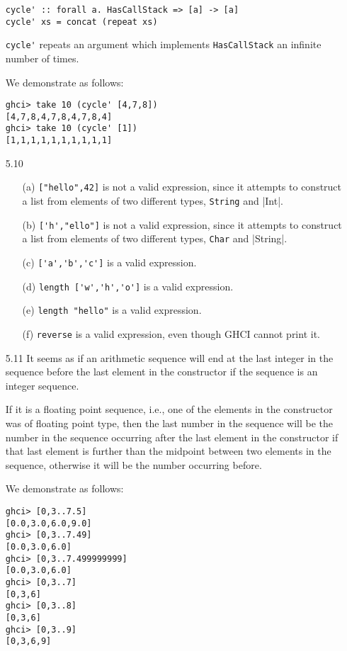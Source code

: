 \documentclass{article}
\begin{document}
\begin{itemize}
\begin{verbatim}
cycle' :: forall a. HasCallStack => [a] -> [a]
cycle' xs = concat (repeat xs)
        \end{verbatim}
        \verb|cycle'| repeats an argument which implements \verb|HasCallStack| an
        infinite number of times.\par
        \qquad We demonstrate as follows:
        \begin{verbatim}
ghci> take 10 (cycle' [4,7,8])
[4,7,8,4,7,8,4,7,8,4]
ghci> take 10 (cycle' [1])
[1,1,1,1,1,1,1,1,1,1]
        \end{verbatim}
        \item[5.10]
        \begin{itemize}
            \item[(a)] \verb|["hello",42]| is not a valid expression, since it
            attempts to construct a list from elements of two different types,
            \verb|String| and |Int|.
            \item[(b)] \verb|['h',"ello"]| is not a valid expression, since it
            attempts to construct a list from elements of two different types,
            \verb|Char| and |String|.
            \item[(c)] \verb|['a','b','c']| is a valid expression.
            \item[(d)] \verb|length ['w','h','o']| is a valid expression.
            \item[(e)] \verb|length "hello"| is a valid expression.
            \item[(f)] \verb|reverse| is a valid expression, even though GHCI cannot
            print it.
        \end{itemize}
        \item[5.11] It seems as if an arithmetic sequence will end at the last 
        integer in the sequence before the last element in the constructor if the 
        sequence is an integer sequence.\par
        \qquad If it is a floating point sequence, i.e., one of the elements in the 
        constructor was of floating point type, then the last number in the sequence 
        will be the number in the sequence occurring after the last element in the 
        constructor if that last element is further than the midpoint between two 
        elements in the sequence, otherwise it will be the number occurring before.\par
        We demonstrate as follows:
        \begin{verbatim}
ghci> [0,3..7.5]
[0.0,3.0,6.0,9.0]
ghci> [0,3..7.49]
[0.0,3.0,6.0]
ghci> [0,3..7.499999999]
[0.0,3.0,6.0]
ghci> [0,3..7]
[0,3,6]
ghci> [0,3..8]
[0,3,6]
ghci> [0,3..9]
[0,3,6,9]
        \end{verbatim}
    \end{itemize}
\end{document}
